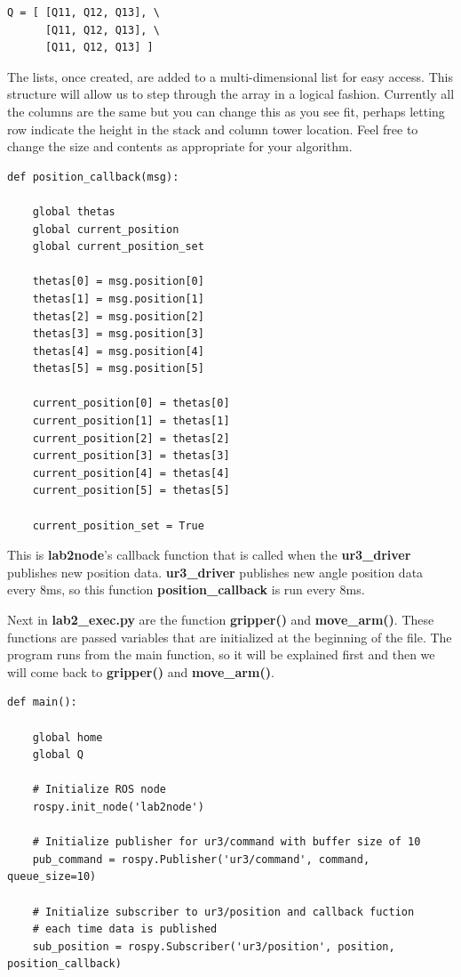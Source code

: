 {\footnotesize
\begin{verbatim}
Q = [ [Q11, Q12, Q13], \
      [Q11, Q12, Q13], \
      [Q11, Q12, Q13] ]
\end{verbatim}} 
 
The lists, once created, are added to a multi-dimensional list for easy access. This structure will allow us to step through the array in a 
logical fashion. Currently all the columns are the same but you can change this as you see fit, perhaps letting row indicate the height in the
stack and column tower location. Feel free to change the size
and contents as appropriate for your algorithm.
 
{\footnotesize
\begin{verbatim}
def position_callback(msg):

    global thetas
    global current_position
    global current_position_set

    thetas[0] = msg.position[0]
    thetas[1] = msg.position[1]
    thetas[2] = msg.position[2]
    thetas[3] = msg.position[3]
    thetas[4] = msg.position[4]
    thetas[5] = msg.position[5]

    current_position[0] = thetas[0]
    current_position[1] = thetas[1]
    current_position[2] = thetas[2]
    current_position[3] = thetas[3]
    current_position[4] = thetas[4]
    current_position[5] = thetas[5]

    current_position_set = True
\end{verbatim}}

This is \textbf{lab2node}'s callback function that is called when the \textbf{ur3\_driver} publishes new position data.  \textbf{ur3\_driver} publishes new
angle position data every 8ms, so this function \textbf{position\_callback} is run every 8ms.  
   
Next in \textbf{lab2\_exec.py} are the function \textbf{gripper()} and \textbf{move\_arm()}.  These functions are passed variables that are initialized at the beginning of the file. The program runs from the main function, so it will
be explained first and then we will come back to \textbf{gripper()} and \textbf{move\_arm()}.
   
{\footnotesize
\begin{verbatim}
def main():

    global home
    global Q

    # Initialize ROS node
    rospy.init_node('lab2node')

    # Initialize publisher for ur3/command with buffer size of 10
    pub_command = rospy.Publisher('ur3/command', command, queue_size=10)

    # Initialize subscriber to ur3/position and callback fuction
    # each time data is published
    sub_position = rospy.Subscriber('ur3/position', position, position_callback)

\end{verbatim}}


